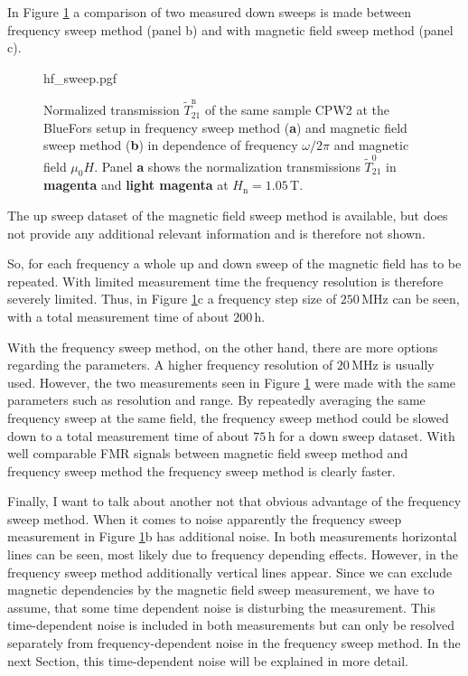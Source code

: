 In Figure \ref{fig:analysis_hf_sweep} a comparison of two measured down sweeps is made between frequency sweep method (panel b) and with magnetic field sweep method (panel c). 
\begin{figure}
    \centering
    {hf_sweep.pgf}
    \caption[Normalized transmission of sample CPW2 in frequency and magnetic field sweep method]{Normalized transmission $\widetilde{T}_{21}^\text{n}$ of the same sample CPW2 at the BlueFors setup in frequency sweep method (\textbf{\color{antiseeblau100}a}) and magnetic field sweep method (\textbf{\color{antiseeblau100}b}) in dependence of frequency $\omega/2\pi$ and magnetic field $\mu_0H$. Panel \textbf{\color{antiseeblau100}a} shows the normalization transmissions $\widetilde{T}_{21}^0$ in \textbf{\color{antiseeblau100}magenta} and \textbf{\color[rgb]{0.878733401483036, 0.49928686449731624, 0.7675654756534815}light magenta} at $H_\text{n}=1.05\,$T.}
    \label{fig:analysis_hf_sweep}
\end{figure}
The up sweep dataset of the magnetic field sweep method is available, but does not provide any additional relevant information and is therefore not shown. 

So, for each frequency a whole up and down sweep of the magnetic field has to be repeated. With limited measurement time the frequency resolution is therefore severely limited. Thus, in Figure \ref{fig:analysis_hf_sweep}c a frequency step size of $250\,$MHz can be seen, with a total measurement time of about $200\,$h.

With the frequency sweep method, on the other hand, there are more options regarding the parameters. A higher frequency resolution of $20\,$MHz is usually used. However, the two measurements seen in Figure \ref{fig:analysis_hf_sweep} were made with the same parameters such as resolution and range. By repeatedly averaging the same frequency sweep at the same field, the frequency sweep method could be slowed down to a total measurement time of about $75\,$h for a down sweep dataset. With well comparable FMR signals between magnetic field sweep method and frequency sweep method the frequency sweep method is clearly faster.

Finally, I want to talk about another not that obvious advantage of the frequency sweep method. When it comes to noise apparently the frequency sweep measurement in Figure \ref{fig:analysis_hf_sweep}b has additional noise. In both measurements horizontal lines can be seen, most likely due to frequency depending effects. However, in the frequency sweep method additionally vertical lines appear. Since we can exclude magnetic dependencies by the magnetic field sweep measurement, we have to assume, that some time dependent noise is disturbing the measurement. This time-dependent noise is included in both measurements but can only be resolved separately from frequency-dependent noise in the frequency sweep method. In the next Section, this time-dependent noise will be explained in more detail.

